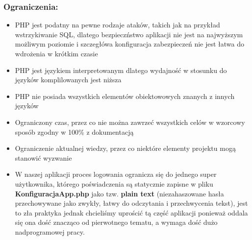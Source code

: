 \subsubsection{Ograniczenia:}
\begin{itemize}
    \item PHP jest podatny na pewne rodzaje ataków, takich jak na przykład wstrzykiwanie SQL, dlatego bezpieczństwo aplikacji nie jest na najwyższym możliwym poziomie i szczegłówa konfiguracja zabezpieczeń nie jest łatwa do wdrożenia w krótkim czasie
    \item PHP jest językiem interpretowanym dlatego wydajność w stosunku do języków komplilowanych jest niższa
    \item PHP nie posiada wszystkich elementów obiektowowych znanych z innych języków
    \item Ograniczony czas, przez co nie można zawrzeć wszystkich celów w wzorcowy sposób zgodny w 100\% z dokumentacją
    \item Ograniczenie aktualnej wiedzy, przez co niektóre elementy projektu mogą stanowić wyzwanie
    \item W naszej aplikacji proces logowania ogranicza się do jednego super użytkownika, którego poświadczenia są statycznie zapisne w pliku \textbf{KonfiguracjaApp.php} jako tzw. \textbf{plain text} (niezahaszowane hasła przechowywane jako zwykły, łatwy do odczytania i przechwycenia tekst), jest to zła praktyka jednak chcieliśmy uprościć tą część aplikacji ponieważ oddala się ona dość znacząco od pierwotnego tematu, a wymaga dość dużo nadprogramowej pracy.
\end{itemize}

\pagebreak

